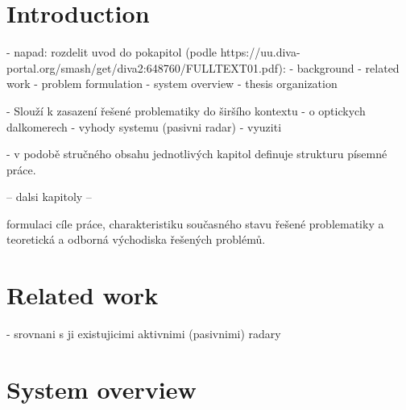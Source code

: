 

\setcounter{secnumdepth}{2}

\chapter{Introduction}

- napad: rozdelit uvod do pokapitol (podle https://uu.diva-portal.org/smash/get/diva2:648760/FULLTEXT01.pdf):
	- background
	- related work
	- problem formulation
	- system overview
	- thesis organization

- Slouží k zasazení řešené problematiky do širšího kontextu
- o optickych dalkomerech
- vyhody systemu (pasivni radar)
- vyuziti

- v podobě stručného obsahu jednotlivých kapitol definuje strukturu písemné práce.


-- dalsi kapitoly --

 formulaci cíle práce, charakteristiku současného stavu
 řešené problematiky a teoretická a odborná východiska řešených problémů.

 

\chapter{Related work}

- srovnani s ji existujicimi aktivnimi (pasivnimi) radary

\chapter{System overview}

